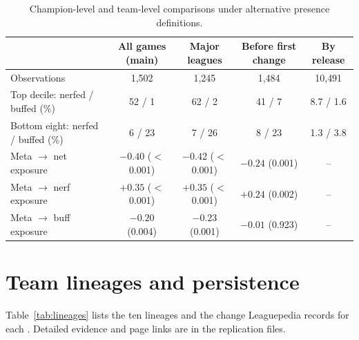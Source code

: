 \documentclass[11pt]{article}
\begin{document}
\begin{table}[h]
\centering
\small
\caption{Champion-level and team-level comparisons under alternative presence definitions.}
\label{tab:presence}
\setlength{\tabcolsep}{4pt}
\begin{tabular}{lcccc}
\toprule
 & All games (main) & Major leagues & Before first change & By release \\
\midrule
Observations & 1{,}502 & 1{,}245 & 1{,}484 & 10{,}491 \\
Top decile: nerfed / buffed (\%) & 52 / 1 & 62 / 2 & 41 / 7 & 8.7 / 1.6 \\
Bottom eight: nerfed / buffed (\%) & 6 / 23 & 7 / 26 & 8 / 23 & 1.3 / 3.8 \\
Meta $\to$ net exposure & $-0.40$ ($<$0.001) & $-0.42$ ($<$0.001) & $-0.24$ (0.001) & -- \\
Meta $\to$ nerf exposure & $+0.35$ ($<$0.001) & $+0.35$ ($<$0.001) & $+0.24$ (0.002) & -- \\
Meta $\to$ buff exposure & $-0.20$ (0.004) & $-0.23$ (0.001) & $-0.01$ (0.923) & -- \\
\bottomrule
\end{tabular}
\end{table}

\section{Team lineages and persistence}
\label{app:orgs}
Table~\ref{tab:lineages} lists the ten lineages and the change Leaguepedia records for each \citep{leaguepedia}. Detailed evidence and page links are in the replication files.
\end{document}
